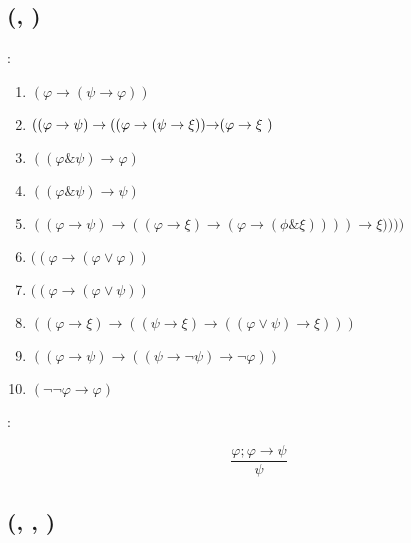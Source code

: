 %

\section{\textcyr{\CYRI\cyrs\cyrch\cyri\cyrs\cyrl\cyre\cyrn\cyri\cyre} \textcyr{\cyrv\cyrery\cyrs\cyrk\cyra\cyrz\cyrery\cyrv\cyra\cyrn\cyri\cyrishrt}
\textcyr{\CYRG\cyri\cyrl\cyrsftsn\cyrb\cyre\cyrr\cyrt\cyro\cyrv\cyrs\cyrk\cyro\cyrg\cyro}
\textcyr{\cyrt\cyri\cyrp\cyra}}

\subsection{\textcyr{\CYRO\cyrp\cyrr\cyre\cyrd\cyre\cyrl\cyre\cyrn\cyri\cyre}
(\textcyr{\CYRA\cyrk\cyrs\cyri\cyro\cyrm\cyrery}, \textcyr{\cyrp\cyrr\cyra\cyrv\cyri\cyrl\cyro}
\textcyr{\cyrv\cyrery\cyrv\cyro\cyrd\cyra})}

\textcyr{\CYRA\cyrk\cyrs\cyri\cyro\cyrm\cyrery}:
\begin{enumerate}
\item $(\varphi\rightarrow(\psi\rightarrow\varphi))$
\item $((\varphi\rightarrow\psi)\rightarrow((\varphi\rightarrow(\psi\rightarrow\text{\ensuremath{\xi}))\ensuremath{\rightarrow}(\ensuremath{\varphi\rightarrow\xi}\ })$
\item $((\varphi\&\psi)\rightarrow\varphi)$
\item $((\varphi\&\psi)\rightarrow\psi)$
\item $((\varphi\rightarrow\psi)\rightarrow((\varphi\rightarrow\xi)\rightarrow(\varphi\rightarrow(\phi\&\xi))))\rightarrow\xi))))$
\item $((\varphi\rightarrow(\varphi\lor\varphi))$
\item $((\varphi\rightarrow(\varphi\lor\psi))$
\item $((\varphi\rightarrow\xi)\rightarrow((\psi\rightarrow\xi)\rightarrow((\varphi\lor\psi)\rightarrow\xi)))$
\item $((\varphi\rightarrow\psi)\rightarrow((\psi\rightarrow\neg\psi)\rightarrow\neg\varphi))$
\item $(\neg\neg\varphi\rightarrow\varphi)$
\end{enumerate}
\textcyr{\CYRP\cyrr\cyra\cyrv\cyri\cyrl\cyro} \textcyr{\cyrv\cyrery\cyrv\cyro\cyrd\cyra}: 

\[
\frac{\varphi;\varphi\rightarrow\psi}{\psi}
\]


\subsection{\textcyr{\CYRO\cyrp\cyrr\cyre\cyrd\cyre\cyrl\cyre\cyrn\cyri\cyre}
(\textcyr{\CYRD\cyro\cyrk\cyra\cyrz\cyra\cyrt\cyre\cyrl\cyrsftsn\cyrs\cyrt\cyrv\cyro},
\textcyr{\cyrd\cyro\cyrk\cyra\cyrz\cyru\cyre\cyrm\cyra\cyrya} \textcyr{\cyrf\cyro\cyrr\cyrm\cyru\cyrl\cyra},
\textcyr{\cyrd\cyro\cyrk\cyra\cyrz\cyru\cyre\cyrm\cyra\cyrya} \textcyr{\cyri\cyrz}
\textcyr{\cyrm\cyrn\cyro\cyrzh\cyre\cyrs\cyrt\cyrv\cyra} \textcyr{\cyrf\cyro\cyrr\cyrm\cyru\cyrl\cyra})}

